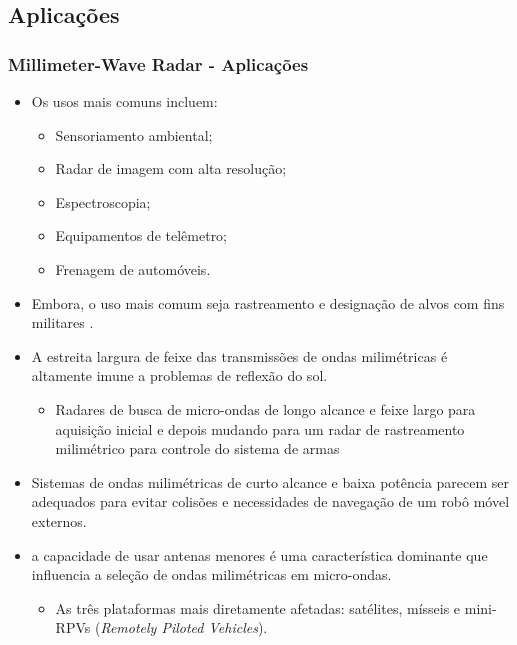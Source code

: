 \documentclass[xcolor=dvipsnames, aspectratio=169]{beamer}
\begin{document}
    \subsection[Introdução]{Aplicações} 
    \begin{frame}
    \frametitle{Millimeter-Wave Radar - Aplicações}
        \begin{itemize}
            \item Os usos mais comuns incluem:
            \begin{itemize}
                \item Sensoriamento ambiental;
                \item Radar de imagem com alta resolução;
                \item Espectroscopia;
                \item Equipamentos de telêmetro;
                \item Frenagem de automóveis.
            \end{itemize}
            \item Embora, o uso mais comum seja rastreamento e designação de alvos com fins militares \cite{everett1995sensors}.
            \item A estreita largura de feixe das transmissões de ondas milimétricas é altamente
            imune a problemas de reflexão do sol.
            \begin{itemize}
                \item Radares de busca de micro-ondas de longo alcance
                e feixe largo para aquisição inicial e depois mudando para um radar de rastreamento
                milimétrico para controle do sistema de armas
            \end{itemize}
            \item Sistemas de ondas milimétricas de curto alcance e baixa potência parecem ser
            adequados para evitar colisões e necessidades de navegação de um robô móvel
            externos.
            \item a capacidade de usar antenas menores é uma característica
            dominante que influencia a seleção de ondas milimétricas em micro-ondas. 
            \begin{itemize}
                \item As três plataformas mais diretamente afetadas: satélites, mísseis e mini-RPVs (\textit{Remotely Piloted Vehicles}).
            \end{itemize}
            \newpage

\end{itemize}
\end{frame}
\end{document}
